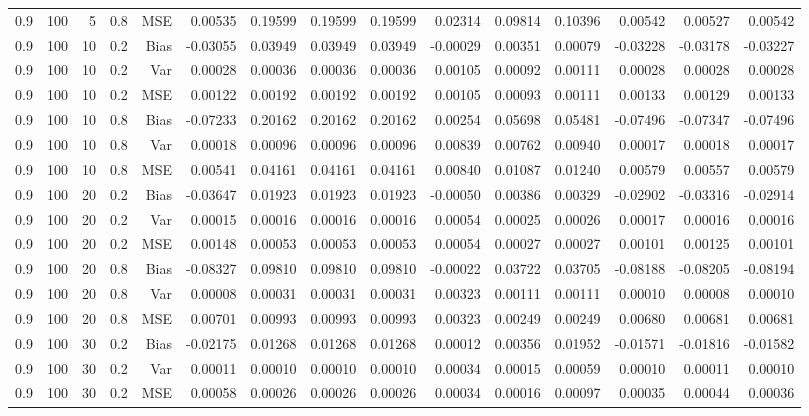 \begin{table}[!htbp]
\begin{tabular}{lrrrrrrrrrrrrrr}
0.9 & 100 &  5 & 0.8 & MSE & 0.00535 & 0.19599 & 0.19599 & 0.19599 & 0.02314 & 0.09814 & 0.10396 & 0.00542 & 0.00527 & 0.00542 \\
0.9 & 100 & 10 & 0.2 & Bias & -0.03055 & 0.03949 & 0.03949 & 0.03949 & -0.00029 & 0.00351 & 0.00079 & -0.03228 & -0.03178 & -0.03227 \\
0.9 & 100 & 10 & 0.2 & Var & 0.00028 & 0.00036 & 0.00036 & 0.00036 & 0.00105 & 0.00092 & 0.00111 & 0.00028 & 0.00028 & 0.00028 \\
0.9 & 100 & 10 & 0.2 & MSE & 0.00122 & 0.00192 & 0.00192 & 0.00192 & 0.00105 & 0.00093 & 0.00111 & 0.00133 & 0.00129 & 0.00133 \\
0.9 & 100 & 10 & 0.8 & Bias & -0.07233 & 0.20162 & 0.20162 & 0.20162 & 0.00254 & 0.05698 & 0.05481 & -0.07496 & -0.07347 & -0.07496 \\
0.9 & 100 & 10 & 0.8 & Var & 0.00018 & 0.00096 & 0.00096 & 0.00096 & 0.00839 & 0.00762 & 0.00940 & 0.00017 & 0.00018 & 0.00017 \\
0.9 & 100 & 10 & 0.8 & MSE & 0.00541 & 0.04161 & 0.04161 & 0.04161 & 0.00840 & 0.01087 & 0.01240 & 0.00579 & 0.00557 & 0.00579 \\
0.9 & 100 & 20 & 0.2 & Bias & -0.03647 & 0.01923 & 0.01923 & 0.01923 & -0.00050 & 0.00386 & 0.00329 & -0.02902 & -0.03316 & -0.02914 \\
0.9 & 100 & 20 & 0.2 & Var & 0.00015 & 0.00016 & 0.00016 & 0.00016 & 0.00054 & 0.00025 & 0.00026 & 0.00017 & 0.00016 & 0.00016 \\
0.9 & 100 & 20 & 0.2 & MSE & 0.00148 & 0.00053 & 0.00053 & 0.00053 & 0.00054 & 0.00027 & 0.00027 & 0.00101 & 0.00125 & 0.00101 \\
0.9 & 100 & 20 & 0.8 & Bias & -0.08327 & 0.09810 & 0.09810 & 0.09810 & -0.00022 & 0.03722 & 0.03705 & -0.08188 & -0.08205 & -0.08194 \\
0.9 & 100 & 20 & 0.8 & Var & 0.00008 & 0.00031 & 0.00031 & 0.00031 & 0.00323 & 0.00111 & 0.00111 & 0.00010 & 0.00008 & 0.00010 \\
0.9 & 100 & 20 & 0.8 & MSE & 0.00701 & 0.00993 & 0.00993 & 0.00993 & 0.00323 & 0.00249 & 0.00249 & 0.00680 & 0.00681 & 0.00681 \\
0.9 & 100 & 30 & 0.2 & Bias & -0.02175 & 0.01268 & 0.01268 & 0.01268 & 0.00012 & 0.00356 & 0.01952 & -0.01571 & -0.01816 & -0.01582 \\
0.9 & 100 & 30 & 0.2 & Var & 0.00011 & 0.00010 & 0.00010 & 0.00010 & 0.00034 & 0.00015 & 0.00059 & 0.00010 & 0.00011 & 0.00010 \\
0.9 & 100 & 30 & 0.2 & MSE & 0.00058 & 0.00026 & 0.00026 & 0.00026 & 0.00034 & 0.00016 & 0.00097 & 0.00035 & 0.00044 & 0.00036 \\

\end{tabular}
\end{table}

